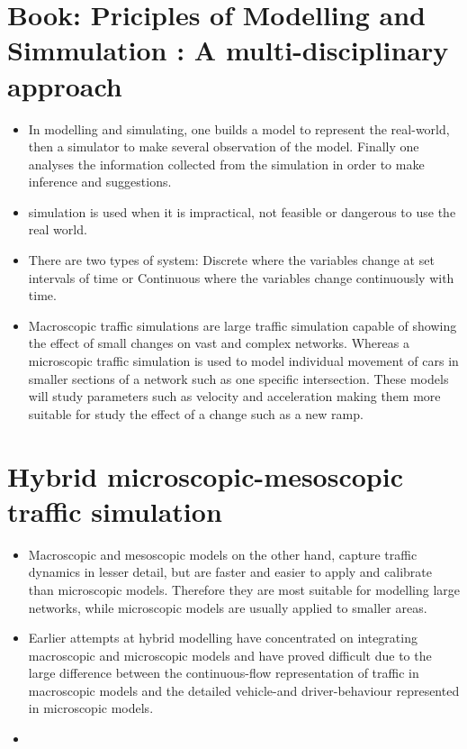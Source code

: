\documentclass[]{article}
\begin{document}
	\section{Book: Priciples of Modelling and Simmulation : A multi-disciplinary approach}
	\begin{itemize}
		\item In modelling and simulating, one builds a model to represent the real-world, then a simulator to make several observation of the model. Finally one analyses the information collected from the simulation in order to make inference and suggestions. 
		\item simulation is used when it is impractical, not feasible or dangerous to use the real world. 
		\item There are two types of system: Discrete where the variables change at set intervals of time or Continuous where the variables change continuously with time.  
		\item Macroscopic traffic simulations are large traffic simulation capable of showing the effect of small changes on vast and complex networks. Whereas a microscopic traffic simulation is used to model individual movement of cars  in smaller sections of a network such as one specific intersection. These models will study parameters such as velocity and acceleration making them more suitable for study the effect of a change such as a new ramp. \cite{sokolowski2011principles}
	\end{itemize}

	\section{Hybrid microscopic-mesoscopic traffic simulation}
	\begin{itemize}
		\item Macroscopic and mesoscopic models on the other hand, capture traffic dynamics in lesser detail, but are faster and easier to apply and calibrate than microscopic models. Therefore they are most suitable for modelling large networks, while microscopic models are usually applied to smaller areas.
		\item Earlier attempts at hybrid modelling have concentrated on integrating macroscopic and microscopic models and have proved difficult due to the large difference between the continuous-flow representation of traffic in macroscopic models and the detailed vehicle-and driver-behaviour represented in microscopic models.
		\item 
	\end{itemize}
	


\end{document}
